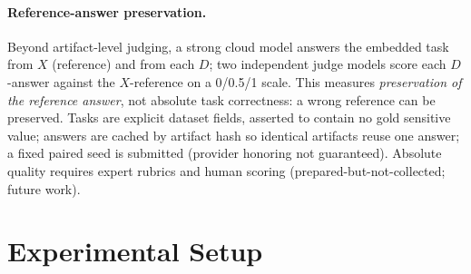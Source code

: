 \documentclass[journal]{IEEEtran}
\begin{document}
\paragraph{Reference-answer preservation.} Beyond artifact-level judging, a strong cloud model answers the embedded task from $X$ (reference) and from each $D$; two independent judge models score each $D$-answer against the $X$-reference on a 0/0.5/1 scale. This measures \emph{preservation of the reference answer}, not absolute task correctness: a wrong reference can be preserved. Tasks are explicit dataset fields, asserted to contain no gold sensitive value; answers are cached by artifact hash so identical artifacts reuse one answer; a fixed paired seed is submitted (provider honoring not guaranteed). Absolute quality requires expert rubrics and human scoring (prepared-but-not-collected; future work).

\section{Experimental Setup}
\end{document}
